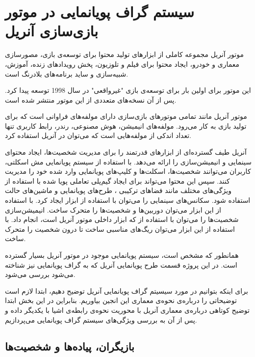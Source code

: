 \chapter {سیستم گراف پویانمایی در موتور بازی‌سازی آنریل}

موتور آنریل مجموعه کاملی از ابزار‌های تولید محتوا برای توسعه‌ی بازی، مصورسازی معماری و خودرو، 
ایجاد محتوا برای فیلم و تلوزیون،
پخش رویداد‌های زنده، آموزش، شبیه‌سازی 
و ساید برنامه‌های بلادرنگ است.

این موتور برای اولین بار برای توسعه‌ی بازی "غیرواقعی" در سال 1998 توسعه پیدا کرد.
پس از آن نسخه‌های متعددی از این موتور منتشر شده است.
\cite{UnrealEngineWikiPedia}

موتور آنریل مانند تمامی موتور‌های بازی‌سازی دارای مولفه‌های فراوانی است که برای 
تولید بازی به کار می‌رود.
مولفه‌های انیمیشن، هوش مصنوعی، رندر، رابط کاربری تنها تعداد اندکی از مولفه‌هایی است که ‌می‌توان در 
آنریل استفاده کرد.

آنریل طیف گسترده‌ای از ابزار‌های قدرتمند را برای مدیریت شخصیت‌ها، ایجاد محتوای سینمایی 
و انیمیشن‌سازی را ارائه می‌دهد.
با استفاده از سیستم پویانمایی مش اسکلتی، 
کاربران می‌توانند شخصیت‌ها، اسکلت‌ها و کلیپ‌های پویانمایی 
وارد شده خود را مدیریت کنند.
سپس این محتوا می‌تواند برای ایجاد گیم‌پلی تعاملی پویا شده با استفاده از 
ویژگی‌های مختلف مانند 
فضا‌های ترکیبی 
، طرح‌های پویانمایی 
و ماشین‌های حالت 
استفاده شود.
سکانس‌های سینمایی را می‌توان با استفاده از ابزار 
ایجاد کرد. با استفاده از این ابزار می‌توان 
دوربین‌ها و شخصیت‌ها را متحرک ساخت.
انیمیشن‌سازی شخصیت‌ها را می‌توان با استفاده از 
که ابزار داخلی 
موتور آنریل است، انجام داد.
با استفاده از این ابزار می‌توان ریگ‌های مناسبی ساخت تا 
درون 
شخصیت را متحرک ساخت.
\cite{UnrealEngineAnimation}

همانطور که مشخص است، سیستم پویانمایی موجود در موتور آنریل بسیار گسترده است. در این پروژه 
قسمت طرح پویانمایی آنریل که به گراف پویانمایی نیز شناخته می‌شود بررسی می‌شود.

برای اینکه بتوانیم در مورد سیسیتم گراف پویانمایی آنریل توضیح دهیم، ابتدا لازم است 
توضیحاتی را درباره‌ی نحوه‌ی معماری این انجین بیاوریم. بنابراین در این بخش ابتدا توضیح کوتاهی 
درباره‌ی معماری آنریل با محوریت نحوه‌ی رابطه‌‌ی اشیا با یکدیگر داده و 
پس از آن به بررسی ویژگی‌های سیستم گراف پویانمایی می‌پردازیم.

 
\section{بازیگران، پیاده‌ها و شخصیت‌‌ها}

